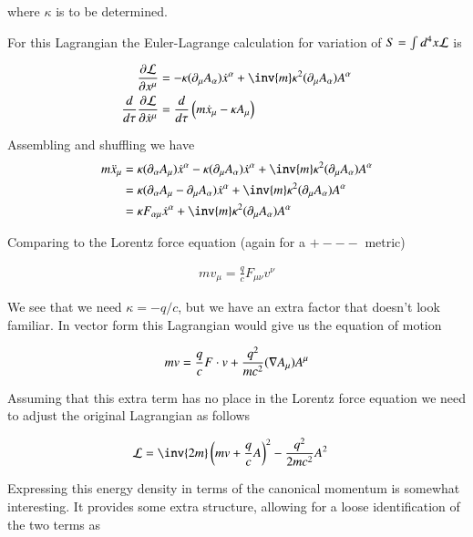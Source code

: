 where $\kappa$ is to be determined.

For this Lagrangian the Euler-Lagrange calculation for variation of $S = \int d^4 x \mathcal{L}$ is

\begin{align*}
\PD{x^\mu}{\LL}
&= - \kappa (\partial_\mu A_\alpha) \xdot^\alpha + \inv{m} \kappa^2 (\partial_\mu A_\alpha) A^\alpha \\
\frac{d}{d\tau} \PD{\xdot^\mu}{\LL} 
&= \frac{d}{d\tau} \left(m \xdot_\mu - \kappa A_\mu \right)
\end{align*}

Assembling and shuffling we have
\begin{align*}
m \xddot_\mu
&= \kappa (\partial_\alpha A_\mu) \xdot^\alpha
- \kappa (\partial_\mu A_\alpha) \xdot^\alpha + \inv{m} \kappa^2 (\partial_\mu A_\alpha) A^\alpha \\
&= \kappa (\partial_\alpha A_\mu - \partial_\mu A_\alpha) \xdot^\alpha + \inv{m} \kappa^2 (\partial_\mu A_\alpha) A^\alpha \\
&= \kappa F_{\alpha\mu} \xdot^\alpha + \inv{m} \kappa^2 (\partial_\mu A_\alpha) A^\alpha \\
\end{align*}

Comparing to the Lorentz force equation (again for a $+---$ metric)

\begin{align*}
m v_\mu = \frac{q}{c} F_{\mu\nu} v^\nu
\end{align*}

We see that we need $\kappa = -q/c$, but we have an extra factor that doesn't look familiar.  In vector form this Lagrangian would give us the
equation of motion

\begin{align*}
m v = \frac{q}{c} F \cdot v + \frac{q^2}{m c^2} (\nabla A_\mu) A^\mu
\end{align*}

Assuming that this extra term has no place in the Lorentz force equation we need to adjust the original Lagrangian as follows

\begin{align}\label{eqn:lorForcePqA:interactionLagPsq}
\LL
&= \inv{2 m}\left( m v + \frac{q}{c} A \right)^2 - \frac{q^2}{ 2 m c^2} A^2
\end{align}

Expressing this energy density in terms of the canonical momentum is 
somewhat interesting.  It provides some extra structure, allowing for a loose identification of the two terms as

